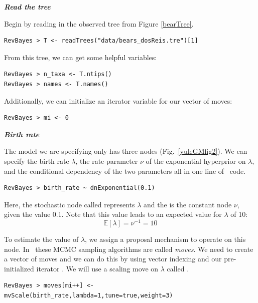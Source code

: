 \textbf{\textit{Read the tree}}

Begin by reading in the observed tree from Figure \ref{bearTree}. 

{\tt \begin{snugshade*}
\begin{lstlisting}
RevBayes > T <- readTrees("data/bears_dosReis.tre")[1]
\end{lstlisting}
\end{snugshade*}}

From this tree, we can get some helpful variables:
{\tt \begin{snugshade*}
\begin{lstlisting}
RevBayes > n_taxa <- T.ntips()
RevBayes > names <- T.names()
\end{lstlisting}
\end{snugshade*}}

Additionally, we can initialize an iterator variable for our vector of moves:
{\tt \begin{snugshade*}
\begin{lstlisting}
RevBayes > mi <- 0 
\end{lstlisting}
\end{snugshade*}}

\textbf{\textit{Birth rate}}

The model we are specifying only has three nodes (Fig.~\ref{yuleGMfig2}). 
We can specify the birth rate $\lambda$, the rate-parameter $\nu$ of the exponential hyperprior on $\lambda$, and the conditional dependency of the two parameters all in one line of \Rev~code.
{\tt \begin{snugshade*}
\begin{lstlisting}
RevBayes > birth_rate ~ dnExponential(0.1) 
\end{lstlisting}
\end{snugshade*}}
Here, the stochastic node called  represents $\lambda$ and the  is the constant node $\nu$, given the value 0.1. 
Note that this value leads to an expected value for $\lambda$ of 10:
$$\mathbb{E}[\lambda]=\nu^{-1} = 10$$

To estimate the value of $\lambda$, we assign a proposal mechanism to operate on this node. 
In \RevBayes~these MCMC sampling algorithms are called \textit{moves}. 
We need to create a vector of moves and we can do this by using vector indexing and our pre-initialized iterator .
We will use a scaling move on $\lambda$ called .
{\tt \begin{snugshade*}
\begin{lstlisting}
RevBayes > moves[mi++] <- mvScale(birth_rate,lambda=1,tune=true,weight=3)
\end{lstlisting}
\end{snugshade*}}

